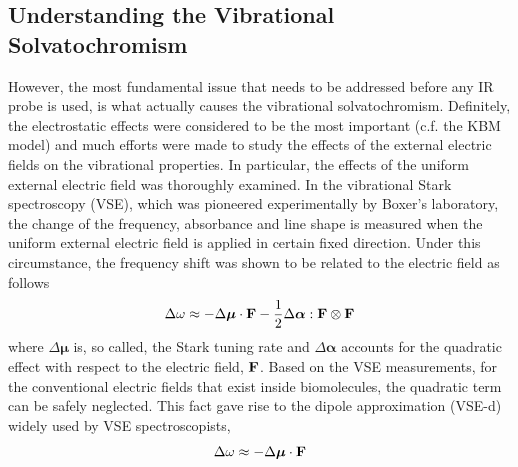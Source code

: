 \documentclass[a4paper,titlepage,twoside,fleqn,12pt]{book}
\newcommand{\BM}[1]{\bm{#1}}
\begin{document}
\begin{refsection}
\section{Understanding the Vibrational Solvatochromism}
%
However, the most fundamental issue that needs to be addressed 
before any IR probe is used, is what actually causes the vibrational solvatochromism.
Definitely, the electrostatic effects were considered to be the most important
(c.f. the KBM model) and much efforts were made to study the effects of the external
electric fields on the vibrational properties.\citep{Kim.Cho.ChemRev.2013} 
In particular, the effects of the
uniform external electric field was thoroughly examined.\citep{Hush.Reimers.JPC.1995,
Reimers.Zeng.Hush.JPC.1996,Andrews.Boxer.JPCA.2002,Cho.JCP.2009} 
In the vibrational Stark spectroscopy (VSE)\citep{Hush.Reimers.JPC.1995,Reimers.Zeng.Hush.JPC.1996}, 
which was pioneered experimentally by Boxer's laboratory\citep{Bublitz.Boxer.AnnuRevPhysChem.1997}, 
the change of the frequency, absorbance
and line shape is measured when the uniform external electric field is applied in certain fixed direction.
Under this circumstance, the frequency shift
was shown to be related to the electric field as follows\citep{Hush.Reimers.JPC.1995,Reimers.Zeng.Hush.JPC.1996}
%
\begin{equation} \label{e:vse-shift-full}
 \Delta \omega \approx - \Delta {\BM \mu} \cdot {\bf F} - \frac{1}{2} \Delta {\BM \alpha} : {\bf F} \otimes {\bf F}
\end{equation}
%
where $\Delta {\BM \mu}$ is, so called, the Stark tuning rate
and $\Delta {\BM \alpha}$ accounts for the quadratic effect with respect to 
the electric field, ${\bf F}$. 
Based on the VSE measurements, for the conventional
electric fields that exist inside biomolecules, the quadratic term
can be safely neglected. 
This fact gave rise to the dipole approximation (VSE-d)
widely used by VSE spectroscopists,
%
\begin{equation} \label{e:vse-shift-dipole}
 \Delta \omega \approx - \Delta {\BM \mu} \cdot {\bf F}

\end{equation}
\end{refsection}
\end{document}
